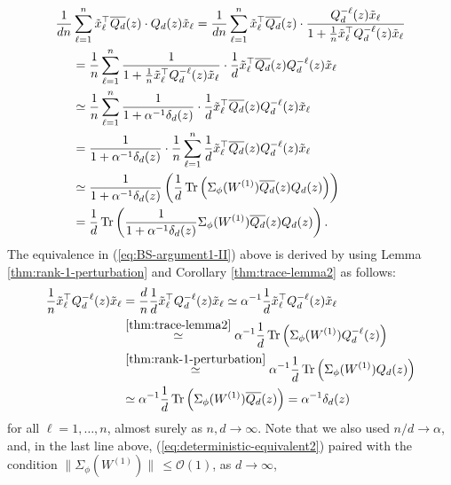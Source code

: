 \documentclass{article}
\begin{document}
 \begin{align}
\frac{1}{dn}&\sum_{\ell=1}^n \tilde{x}_\ell^\top\overline{Q_{d}}(z)\cdot Q_{d}(z)\tilde{x}_\ell = \frac{1}{dn}\sum_{\ell=1}^n \tilde{x}_\ell^\top\overline{Q_{d}}(z)\cdot \frac{Q_{d}^{-\ell}(z)\tilde{x}_\ell}{1+\frac{1}{n}\tilde{x}_\ell^\top Q_{d}^{-\ell}(z)\tilde{x}_\ell} \notag
\\ &= \frac{1}{n}\sum_{\ell=1}^n\frac{1}{1+\frac{1}{n}\tilde{x}_\ell^\top Q_{d}^{-\ell}(z)\tilde{x}_\ell}\cdot\frac{1}{d}\tilde{x}_\ell^\top\overline{Q_{d}}(z)Q_{d}^{-\ell}(z)\tilde{x}_\ell \notag
\\ &\simeq \frac{1}{n}\sum_{\ell=1}^n\frac{1}{1+\alpha^{-1}\delta_d(z)}\cdot\frac{1}{d}\tilde{x}_\ell^\top\overline{Q_{d}}(z)Q_{d}^{-\ell}(z)\tilde{x}_\ell \label{eq:BS-argument1-II}
\\ &= \frac{1}{1+\alpha^{-1}\delta_d(z)}\cdot\frac{1}{n}\sum_{\ell=1}^n\frac{1}{d}\tilde{x}_\ell^\top\overline{Q_{d}}(z)Q_{d}^{-\ell}(z)\tilde{x}_\ell \notag
\\ &\simeq \frac{1}{1+\alpha^{-1}\delta_d(z)}\left(\frac{1}{d}\operatorname{Tr}\left(\Sigma_\phi(W^{(1)})\overline{Q_{d}}(z)Q_{d}(z)\right)\right) \label{eq:BS-argument2-II}
\\ &= \frac{1}{d}\operatorname{Tr}\left(\frac{1}{1+\alpha^{-1}\delta_d(z)}\Sigma_\phi(W^{(1)})\overline{Q_{d}}(z)Q_{d}(z)\right). \notag
\end{align}
The equivalence in (\ref{eq:BS-argument1-II}) above is derived by using Lemma \ref{thm:rank-1-perturbation} and Corollary \ref{thm:trace-lemma2} as follows:
\begin{align}
\frac{1}{n}\tilde{x}_\ell^\top Q_{d}^{-\ell}(z)\tilde{x}_\ell &= \frac{d}{n}\frac{1}{d}\tilde{x}_\ell^\top Q_{d}^{-\ell}(z)\tilde{x}_\ell \simeq \alpha^{-1}\frac{1}{d}\tilde{x}_\ell^\top Q_{d}^{-\ell}(z)\tilde{x}_\ell \notag
\\ &\stackrel{\ref{thm:trace-lemma2}}{\simeq} \alpha^{-1}\frac{1}{d}\operatorname{Tr}\left(\Sigma_\phi(W^{(1)})Q_d^{-\ell}(z)\right) \notag
\\ &\stackrel{\ref{thm:rank-1-perturbation}}{\simeq} \alpha^{-1}\frac{1}{d}\operatorname{Tr}\left(\Sigma_\phi(W^{(1)})Q_d(z)\right) \notag
\\ &\simeq\alpha^{-1}\frac{1}{d}\operatorname{Tr}\left(\Sigma_\phi(W^{(1)})\overline{Q_d}(z)\right)=\alpha^{-1}\delta_d(z)\label{eq:lemmaW1}
\end{align}
for all $\ell=1,\dots,n$, almost surely as $n,d\to\infty$. Note that we also used $n/d\to\alpha$, and, in the last line above, (\ref{eq:deterministic-equivalent2}) paired with the condition $\|\Sigma_\phi(W^{(1)})\|\,\leq\mathcal{O}(1)$, as $d\to\infty$,
\end{document}
